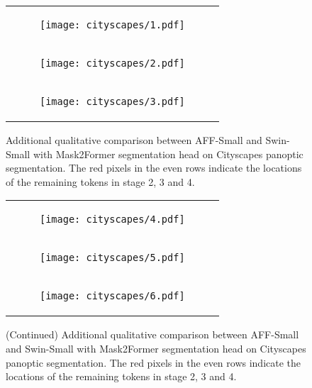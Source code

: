 \documentclass[10pt,twocolumn,letterpaper]{article}
\begin{document}
\begin{figure*}
    \centering
    \begin{footnotesize}
    \begin{tabular}{c}
\vspace{1em}
   \begin{subfigure}{\linewidth}
    \texttt{[image: cityscapes/1.pdf]} 
\end{subfigure} \\
\vspace{1em}
   \begin{subfigure}{\linewidth}
    \texttt{[image: cityscapes/2.pdf]} 
\end{subfigure} \\
\vspace{1em}
   \begin{subfigure}{\linewidth}
    \texttt{[image: cityscapes/3.pdf]} 
\end{subfigure} \\
   
   \end{tabular}
    \end{footnotesize}
    \caption{Additional qualitative comparison between AFF-Small and Swin-Small with Mask2Former segmentation head on Cityscapes panoptic segmentation. The red pixels in the even rows indicate the locations of the remaining tokens in stage 2, 3 and 4.}
    \label{fig:city}
\end{figure*}

\begin{figure*}\ContinuedFloat
    \centering
    \begin{footnotesize}
    \begin{tabular}{c}

\vspace{1em}
   \begin{subfigure}{\linewidth}
    \texttt{[image: cityscapes/4.pdf]} 
\end{subfigure} \\

\vspace{1em}
   \begin{subfigure}{\linewidth}
    \texttt{[image: cityscapes/5.pdf]} 
\end{subfigure} \\
\vspace{1em}
   \begin{subfigure}{\linewidth}
    \texttt{[image: cityscapes/6.pdf]} 
\end{subfigure} \\

       \end{tabular}
    \end{footnotesize}
    \caption{(Continued) Additional qualitative comparison between AFF-Small and Swin-Small with Mask2Former segmentation head on Cityscapes panoptic segmentation. The red pixels in the even rows indicate the locations of the remaining tokens in stage 2, 3 and 4.}
\end{figure*}
\end{document}
